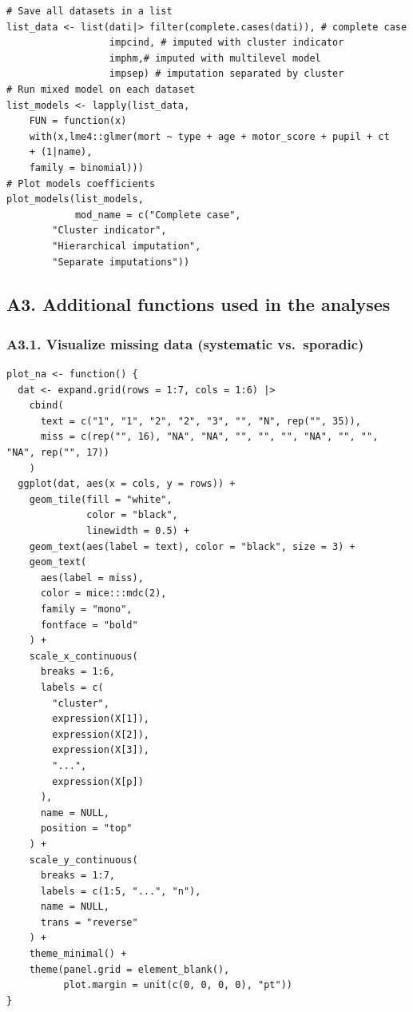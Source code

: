 \documentclass[
  article]{jss}
\begin{document}
\begin{verbatim}
# Save all datasets in a list
list_data <- list(dati|> filter(complete.cases(dati)), # complete case
                  impcind, # imputed with cluster indicator
                  imphm,# imputed with multilevel model
                  impsep) # imputation separated by cluster
# Run mixed model on each dataset
list_models <- lapply(list_data, 
    FUN = function(x) 
    with(x,lme4::glmer(mort ~ type + age + motor_score + pupil + ct 
    + (1|name), 
    family = binomial)))
# Plot models coefficients
plot_models(list_models,
            mod_name = c("Complete case",
        "Cluster indicator",
        "Hierarchical imputation",
        "Separate imputations"))
\end{verbatim}

\subsection*{A3. Additional functions used in the
analyses}\label{a3.-additional-functions-used-in-the-analyses}

\subsubsection{A3.1. Visualize missing data (systematic
vs.~sporadic)}\label{a3.1.-visualize-missing-data-systematic-vs.-sporadic}

\begin{verbatim}
plot_na <- function() {
  dat <- expand.grid(rows = 1:7, cols = 1:6) |>
    cbind(
      text = c("1", "1", "2", "2", "3", "", "N", rep("", 35)),
      miss = c(rep("", 16), "NA", "NA", "", "", "", "NA", "", "", "NA", rep("", 17))
    )
  ggplot(dat, aes(x = cols, y = rows)) +
    geom_tile(fill = "white",
              color = "black",
              linewidth = 0.5) +
    geom_text(aes(label = text), color = "black", size = 3) +
    geom_text(
      aes(label = miss),
      color = mice:::mdc(2),
      family = "mono",
      fontface = "bold"
    ) +
    scale_x_continuous(
      breaks = 1:6,
      labels = c(
        "cluster",
        expression(X[1]),
        expression(X[2]),
        expression(X[3]),
        "...",
        expression(X[p])
      ),
      name = NULL,
      position = "top"
    ) +
    scale_y_continuous(
      breaks = 1:7,
      labels = c(1:5, "...", "n"),
      name = NULL,
      trans = "reverse"
    ) +
    theme_minimal() +
    theme(panel.grid = element_blank(),
          plot.margin = unit(c(0, 0, 0, 0), "pt"))
}
\end{verbatim}
\end{document}

